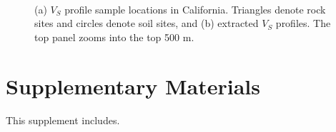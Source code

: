 
\clearpage
{}
\begin{figure}[!ht]
     \\[1.2\baselineskip]%
    \caption{ (a) $V_S$ profile sample locations in California. Triangles denote rock sites and circles denote soil sites, and (b) extracted $V_S$ profiles. The top panel zooms into the top 500 m. }
    \label{fig:highf-7}
\end{figure}


\setcounter{table}{0}
\setcounter{figure}{0}
\renewcommand{\thetable}{S\arabic{chapter}.\arabic{table}}
\renewcommand{\thefigure}{S\arabic{chapter}.\arabic{figure}}
\newpage
\section*{Supplementary Materials}

This supplement includes.




\renewcommand{\thetable}{\arabic{table}}
\renewcommand{\thefigure}{\arabic{figure}}


